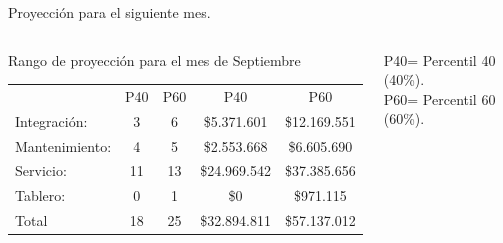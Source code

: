 \documentclass[aspectratio=169,xcolor=dvipsnames]{beamer}
\begin{document}
 \begin{frame}{Proyección para el siguiente mes.}
 \begin{columns}[c]
  \begin{block}{Rango de proyección para el mes de Septiembre}
     
         \begin{tabular}{l|cc|cc}
                       & P40 & P60 & P40 & P60\\ 
          Integración:&3&6&\$5.371.601 &\$12.169.551\\ 
          Mantenimiento:&4 &5 &\$2.553.668&\$6.605.690\\
          Servicio:&11 &13 &\$24.969.542&\$37.385.656\\ 
          Tablero:& 0& 1&\$0&\$971.115\\ \hline 
          Total&18 &25 &\$32.894.811&\$57.137.012\\
     \end{tabular}
       
  \end{block}

\begin{block}{}
        \scriptsize{P40= Percentil 40 (40\%).\\
    P60= Percentil 60 (60\%).}
\end{block}

  \end{columns}
\end{frame}

\end{document}
